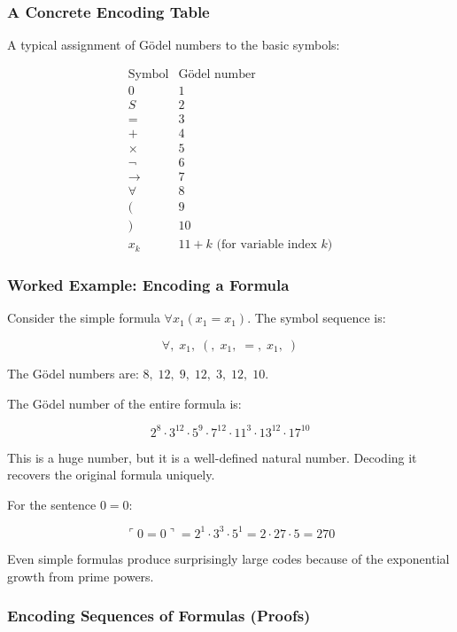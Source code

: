 \subsubsection*{A Concrete Encoding Table}

A typical assignment of Gödel numbers to the basic symbols:

\[
\begin{array}{c|c}
\text{Symbol} & \text{Gödel number} \\ \hline
0 & 1 \\
S & 2 \\
= & 3 \\
+ & 4 \\
\times & 5 \\
\neg & 6 \\
\to & 7 \\
\forall & 8 \\
( & 9 \\
) & 10 \\
x_k & 11 + k \text{ (for variable index } k \text{)}
\end{array}
\]

\subsubsection*{Worked Example: Encoding a Formula}

Consider the simple formula $\forall x_1 (x_1 = x_1)$. The symbol sequence is:

\[
\forall,\; x_1,\; (,\; x_1,\; =,\; x_1,\; )
\]

The Gödel numbers are: $8,\; 12,\; 9,\; 12,\; 3,\; 12,\; 10$.

The Gödel number of the entire formula is:

\[
2^{8} \cdot 3^{12} \cdot 5^{9} \cdot 7^{12} \cdot 11^{3} \cdot 13^{12} \cdot 17^{10}
\]

This is a huge number, but it is a well-defined natural number. Decoding it recovers the original formula uniquely.

For the sentence $0 = 0$:

\[
\ulcorner 0 = 0 \urcorner = 2^{1} \cdot 3^{3} \cdot 5^{1} = 2 \cdot 27 \cdot 5 = 270
\]

Even simple formulas produce surprisingly large codes because of the exponential growth from prime powers.

\subsubsection*{Encoding Sequences of Formulas (Proofs)}

